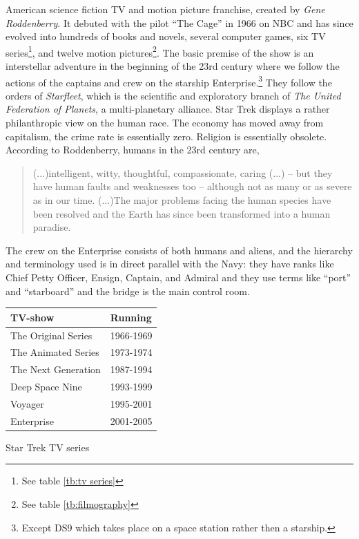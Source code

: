  American science fiction TV and motion picture franchise, created by \textit{Gene Roddenberry}. It debuted with the pilot ``The Cage'' in 1966 on NBC and has since evolved into hundreds of books and novels, several computer games, six TV series\footnote{See table \ref{tb:tv series}}, and twelve motion pictures\footnote{See table \ref{tb:filmography}}. The basic premise of the show is an interstellar adventure in the beginning of the 23rd century where we follow the actions of the captains and crew on the starship Enterprise.\footnote{Except DS9 which takes place on a space station rather then a starship.} They follow the orders of \textit{Starfleet}, which is the scientific and exploratory branch of \textit{The United Federation of Planets}, a multi-planetary alliance. Star Trek displays a rather philanthropic view on the human race. The economy has moved away from capitalism, the crime rate is essentially zero. Religion is essentially obsolete. According to Roddenberry, humans in the 23rd century are,
\blockquote[{\cite{roddenberry_star_1987}}]
{
(...)intelligent, witty, thoughtful, compassionate, caring (...) -- but they have human faults and weaknesses too -- although not as many or as severe as in our time. (...)The major problems facing the human species have been resolved and the Earth has since been transformed into a human paradise.
}
The crew on the Enterprise consists of both humans and aliens, and the hierarchy and terminology used is in direct parallel with the Navy: they have ranks like Chief Petty Officer, Ensign, Captain, and Admiral and they use terms like ``port'' and ``starboard'' and the bridge is the main control room. 

\begin{margintable}
\small
\begin{tabular}{ll}
\toprule
	\textbf{TV-show}		& \textbf{Running}	\\
\midrule
    	The Original Series		& 1966-1969		\\
        The Animated Series		& 1973-1974		\\
        The Next Generation 	& 1987-1994		\\
        Deep Space Nine 		& 1993-1999		\\
        Voyager					& 1995-2001		\\
        Enterprise				& 2001-2005		\\
\bottomrule
\end{tabular}
	\caption{Star Trek TV series}
	\label{tb:tv series}
\end{margintable}

